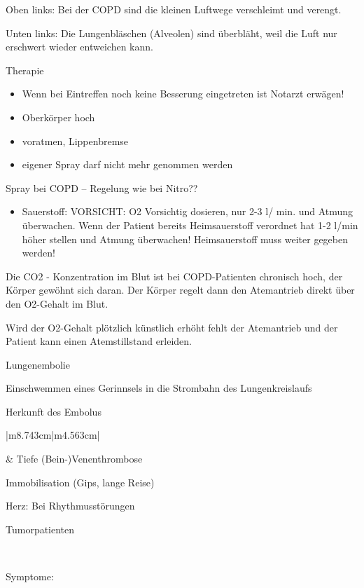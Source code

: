 \documentclass{article}
\begin{document}
Oben links: Bei der COPD sind die kleinen Luftwege verschleimt und
verengt.

Unten links: Die Lungenbl\"aschen (Alveolen) sind \"uberbl\"aht, weil
die Luft nur erschwert wieder entweichen kann. 

Therapie

\begin{itemize}
\item Wenn bei Eintreffen noch keine Besserung eingetreten ist Notarzt
erw\"agen!

\item Oberk\"orper hoch

\item voratmen, Lippenbremse

\item eigener %
%
Spray darf nicht mehr genommen werden

\end{itemize}
Spray bei COPD -- Regelung wie bei Nitro??

\begin{itemize}
\item Sauerstoff: VORSICHT:  O2 Vorsichtig dosieren, nur 2-3 l/ min. und
Atmung \"uberwachen. Wenn der Patient bereits Heimsauerstoff verordnet
hat 1-2 l/min h\"oher stellen und Atmung \"uberwachen! Heimsauerstoff
muss weiter gegeben werden!

\end{itemize}
Die CO2 - Konzentration im Blut ist bei COPD-Patienten chronisch hoch,
der K\"orper gew\"ohnt sich daran. Der K\"orper regelt dann den
Atemantrieb direkt \"uber den O2-Gehalt im Blut. 

Wird der O2-Gehalt pl\"otzlich k\"unstlich erh\"oht fehlt der
Atemantrieb und der Patient kann einen
Atemstillstand erleiden. 

\label{bkm:RefHeading37612625}Lungenembolie

Einschwemmen eines Gerinnsels in die  Strombahn des Lungenkreislaufs

Herkunft des Embolus

\begin{center}
\tablehead{}\begin{supertabular}{|m{8.743cm}|m{4.563cm}|}
 

 &
Tiefe (Bein-)Venenthrombose

Immobilisation (Gips, lange Reise)

Herz: Bei Rhythmusst\"orungen

Tumorpatienten

\\\hline
\end{supertabular}
\end{center}
Symptome:
\end{document}
